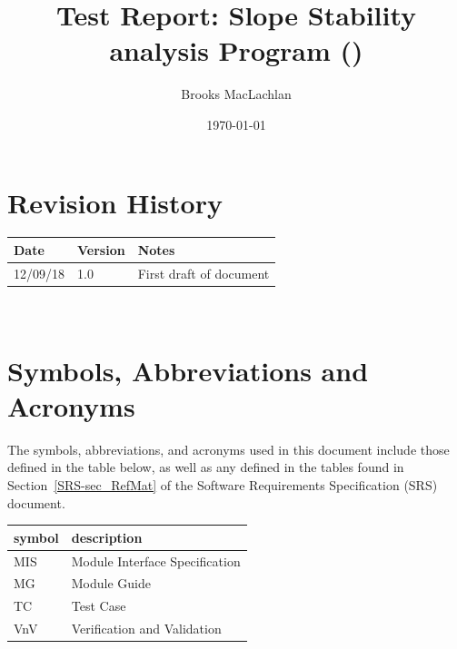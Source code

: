 \documentclass[12pt, titlepage]{article}
\begin{document}
\title{Test Report: Slope Stability analysis Program (\progname)} 
\author{Brooks MacLachlan}
\date{\today}
	
\maketitle


\section{Revision History}

\begin{tabularx}{\textwidth}{p{3cm}p{2cm}X}
\toprule {\bf Date} & {\bf Version} & {\bf Notes}\\
\midrule
12/09/18 & 1.0 & First draft of document\\
\bottomrule
\end{tabularx}

~\newpage

\section{Symbols, Abbreviations and Acronyms}

The symbols, abbreviations, and acronyms used in this document include those 
defined in the table below, as well as any defined in the tables found in 
Section~\ref{SRS-sec_RefMat} of the Software Requirements Specification (SRS) 
document.
\newline

\renewcommand{\arraystretch}{1.2}
\begin{tabular}{l l} 
	\toprule		
	\textbf{symbol} & \textbf{description}\\
	\midrule
	MIS & Module Interface Specification\\
	MG & Module Guide\\
	TC & Test Case\\
	VnV & Verification and Validation\\
	\bottomrule
\end{tabular}\\

\newpage

\tableofcontents

\listoftables %

\listoffigures %

\newpage

\end{document}
